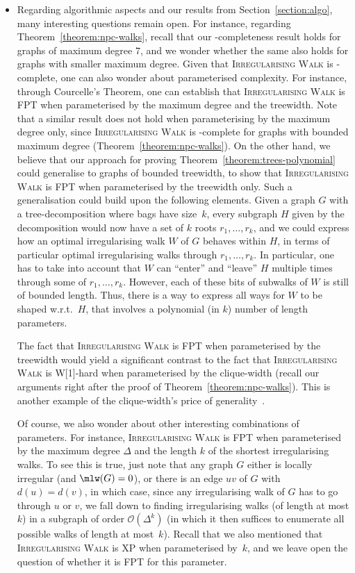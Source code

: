 \documentclass[a4paper,11pt,dvipsnames]{elsarticle}
\begin{document}
\begin{itemize}
    \item Regarding algorithmic aspects and our results from Section~\ref{section:algo}, many interesting questions remain open. For instance, regarding Theorem~\ref{theorem:npc-walks}, recall that our \np-completeness result holds for graphs of maximum degree $7$, and we wonder whether the same also holds for graphs with smaller maximum degree. 
    Given that \textsc{Irregularising Walk} is \np-complete, one can also wonder about parameterised complexity. For instance, through Courcelle's Theorem, one can establish that \textsc{Irregularising Walk} is \textsf{FPT} when parameterised by the maximum degree and the treewidth. Note that a similar result does not hold when parameterising by the maximum degree only, since \textsc{Irregularising Walk} is \np-complete for graphs with bounded maximum degree (Theorem~\ref{theorem:npc-walks}). On the other hand, we believe that our approach for proving Theorem~\ref{theorem:trees-polynomial} could generalise to graphs of bounded treewidth, to show that \textsc{Irregularising Walk} is \textsf{FPT} when parameterised by the treewidth only. Such a generalisation could build upon the following elements. Given a graph $G$ with a tree-decomposition where bags have size~$k$, every subgraph $H$ given by the decomposition would now have a set of $k$ roots $r_1,\dots,r_k$, and we could express how an optimal irregularising walk $W$ of $G$ behaves within $H$, in terms of particular optimal irregularising walks through $r_1,\dots,r_k$. In particular, one has to take into account that $W$ can ``enter'' and ``leave'' $H$ multiple times through some of $r_1,\dots,r_k$. However, each of these bits of subwalks of $W$ is still of bounded length. Thus, there is a way to express all ways for $W$ to be shaped w.r.t.~$H$, that involves a polynomial (in $k$) number of length parameters. 
    
    The fact that \textsc{Irregularising Walk} is \textsf{FPT} when parameterised by the treewidth would yield a significant contrast to the fact that \textsc{Irregularising Walk} is \textsf{W[1]}-hard when parameterised by the clique-width (recall our arguments right after the proof of Theorem~\ref{theorem:npc-walks}).
    This is another example of the clique-width's price of generality~\cite{FGLS09}.
   
    
    Of course, we also wonder about other interesting combinations of parameters. For instance, \textsc{Irregularising Walk} is \textsf{FPT} when parameterised by the maximum degree $\Delta$ and the length $k$ of the shortest irregularising walks. To see this is true, just note that any graph $G$ either is locally irregular (and $\mlw(G)=0$), or there is an edge $uv$ of $G$ with $d(u)=d(v)$, in which case, since any irregularising walk of $G$ has to go through $u$ or $v$, we fall down to finding irregularising walks (of length at most $k$) in a subgraph of order $\mathcal{O}\left(\Delta^k\right)$ (in which it then suffices to enumerate all possible walks of length at most~$k$). Recall that we also mentioned that \textsc{Irregularising Walk} is \textsf{XP} when parameterised by~$k$, and we leave open the question of whether it is \textsf{FPT} for this parameter.
    

\end{itemize}
\end{document}
